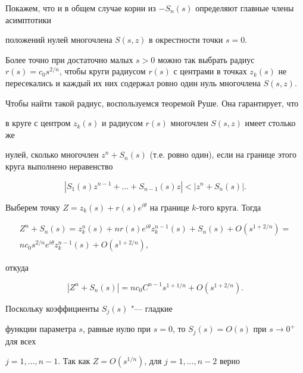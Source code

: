 Покажем, что и в общем случае корни из $-S_n(s)$ определяют главные члены асимптотики 

положений нулей многочлена $S(s,z)$ в окрестности точки $s=0$. 

Более точно  при достаточно малых $s>0$ можно так  выбрать радиус $r(s)=c_0s^{2/n}$, чтобы круги радиусом $r(s)$ с центрами в точках $z_k(s)$ не пересекались и каждый их них содержал ровно один нуль многочлена $S(s,z)$.



Чтобы найти такой радиус, воспользуемся теоремой Руше. Она гарантирует, что

в круге с центром $z_k(s)$ и радиусом $r(s)$ многочлен $S(s,z)$ имеет столько же

нулей, сколько многочлен $z^n+S_n(s)$ (т.е. ровно один), если на границе этого круга выполнено неравенство

\begin{equation}

\label{rouche}

|S_1(s)z^{n-1}+\dots+S_{n-1}(s)z|<|z^n+S_n(s)|.

\end{equation}



Выберем точку $Z=z_k(s)+r(s)e^{i\theta}$ на границе $k$-того круга. Тогда

\begin{multline}

Z^n+S_n(s)=z_k^n(s)+nr(s)e^{i\theta}z_k^{n-1}(s)+S_n(s)+O(s^{1+2/n})=\\

nc_0s^{2/n}e^{i\theta}z_k^{n-1}(s)+O(s^{1+2/n}),

\end{multline}

откуда 

\begin{equation}

\label{ZnBn}

|Z^n+S_n(s)|=nc_0C^{n-1}s^{1+1/n}+O(s^{1+2/n}).

\end{equation} 



Поскольку коэффициенты $S_j(s)$ "---  гладкие

функции параметра $s$, равные нулю при $s=0$, то $S_j(s)=O(s)$ при $s\to0^+$ для всех 

$j=1,\dots,n-1$. Так как $Z=O(s^{1/n})$, для $j=1,\dots,n-2$ верно

